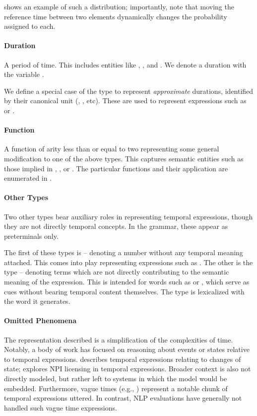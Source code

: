  shows an example of such a distribution;
	importantly, note that moving the reference time between two elements
	dynamically changes the probability assigned to each.
	
\paragraph{Duration}
A period of time.
This includes entities like , , and .
We denote a duration with the variable \dur.

We define a special case of the  type to represent 
	\textit{approximate} durations, identified by their canonical
	unit (, , etc).
These are used to represent expressions such as  or
	.

\paragraph{Function}
A function of arity less than or equal to two representing some
	general modification to one of the above types.
This captures semantic entities such as those implied in
	, 
	, or .
The particular functions and their application are enumerated in 
	.


\paragraph{Other Types}
Two other types bear auxiliary roles in representing temporal expressions,
	though they are not directly temporal concepts.
In the grammar, these appear as preterminals only.

The first of these types is  -- denoting a number without
	any temporal meaning attached.
This comes into play representing expressions such as .
The other is the  type -- denoting terms which are not
	directly contributing to the semantic meaning of the expression.
This is intended for words such as  or , which serve as cues
	without bearing temporal content themselves.
The  type is lexicalized with the word it generates.


\paragraph{Omitted Phenomena}
The representation described is a simplification of the complexities of
	time.
Notably, a body of work has focused on reasoning about events or states
	relative to temporal expressions.
 describes temporal expressions relating to
	changes of state; 
	 explores NPI licensing in temporal
	expressions.
Broader context is also not directly modeled, but rather left to systems
	in which the model would be embedded.
Furthermore, vague times (e.g., ) represent a notable chunk of 
	temporal expressions uttered.
In contrast, NLP evaluations have generally not handled such vague 
	time expressions.

